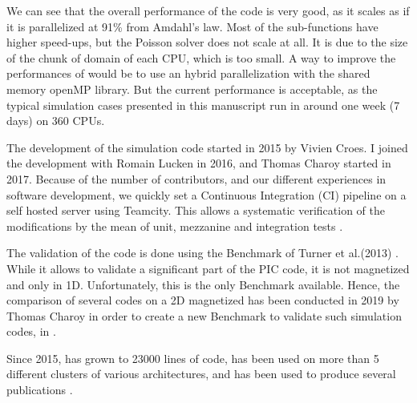 We can see that the overall performance of the code is very good, as it scales as if it is parallelized at 91\% from Amdahl's law.
Most of the sub-functions have higher speed-ups, but the Poisson solver does not scale at all.
It is due to the size of the chunk of domain of each CPU, which is too small.
A way to improve the performances of \LPPic would be to use an hybrid parallelization with the shared memory openMP library.
But the current performance is acceptable, as the typical simulation cases presented in this manuscript run in around one week (7 days) on 360 CPUs.

\vspace{1em}

The development of the  simulation code \LPPic started in 2015 by Vivien Croes.
I joined the development with Romain Lucken in 2016, and Thomas Charoy started in 2017.
Because of the number of contributors, and our different experiences in software development, we quickly set a Continuous Integration (CI) pipeline on a self hosted server using Teamcity.
This allows a systematic verification of the modifications by the mean of unit, mezzanine and integration tests \citep{turner2016}.

The validation of the code is done using the Benchmark of Turner et al.(2013) .
While it allows to validate a significant part of the \ac{PIC} code, it is not magnetized and only in \ac{1D}.
Unfortunately, this is the only Benchmark available.
Hence, the comparison of several codes on a \ac{2D} magnetized  has been conducted in 2019 by Thomas Charoy in order to create a new Benchmark to validate such simulation codes, in \citet{charoy2019}.


Since 2015, \LPPic has grown to 23000 lines of code, has been used on more than 5 different clusters of various architectures, and has been used to produce several publications \citep{croes2017a,croes2018,tavant2018,tavant2019,lucken2018,lucken2019}.
